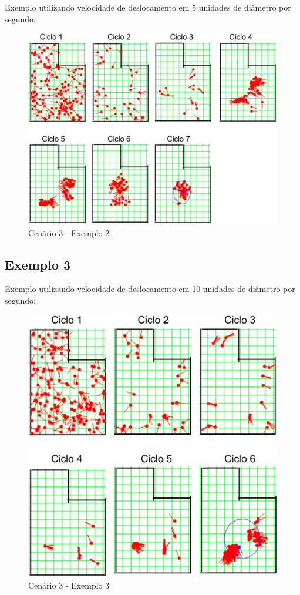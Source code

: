 Exemplo utilizando velocidade de deslocamento em 5 unidades de diâmetro por segundo:

\begin{figure}[H]
  \centering
  \includegraphics[scale=0.4]{figuras/cen3_ex2.eps}
  \caption[Cenário 3 - Exemplo 2]{Cenário 3 - Exemplo 2}
  \label{img:cen3_ex2}
\end{figure}


\subsection{Exemplo 3}

Exemplo utilizando velocidade de deslocamento em 10 unidades de diâmetro por segundo:

\begin{figure}[H]
  \centering
  \includegraphics[scale=0.4]{figuras/cen3_ex3.eps}
  \caption[Cenário 3 - Exemplo 3]{Cenário 3 - Exemplo 3}
  \label{img:cen3_ex3}
\end{figure}

